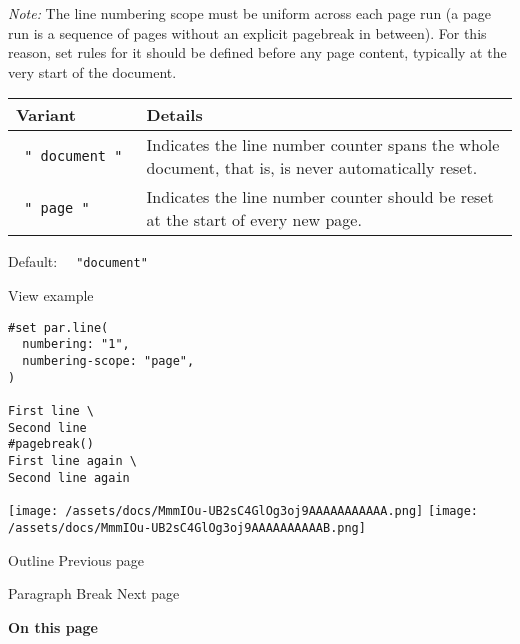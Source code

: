 \emph{Note:} The line numbering scope must be uniform across each page
run (a page run is a sequence of pages without an explicit pagebreak in
between). For this reason, set rules for it should be defined before any
page content, typically at the very start of the document.

\begin{longtable}[]{@{}ll@{}}
\toprule\noalign{}
Variant & Details \\
\midrule\noalign{}
\endhead
\bottomrule\noalign{}
\endlastfoot
\texttt{\ "\ document\ "\ } & Indicates the line number counter spans
the whole document, that is, is never automatically reset. \\
\texttt{\ "\ page\ "\ } & Indicates the line number counter should be
reset at the start of every new page. \\
\end{longtable}

Default: \texttt{\ }{\texttt{\ "document"\ }}\texttt{\ }


View example

\begin{verbatim}
#set par.line(
  numbering: "1",
  numbering-scope: "page",
)

First line \
Second line
#pagebreak()
First line again \
Second line again
\end{verbatim}

\texttt{[image: /assets/docs/MmmIOu-UB2sC4GlOg3oj9AAAAAAAAAAA.png]}
\texttt{[image: /assets/docs/MmmIOu-UB2sC4GlOg3oj9AAAAAAAAAAB.png]}

\href{/docs/reference/model/outline/}{\pandocbounded{}}

{ Outline } { Previous page }

\href{/docs/reference/model/parbreak/}{\pandocbounded{}}

{ Paragraph Break } { Next page }

\textbf{On this page}

